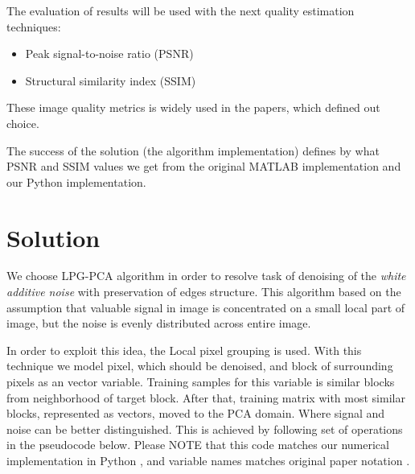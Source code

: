 The evaluation of results will be used with the next quality estimation techniques: 
\begin{itemize}
    \item Peak signal-to-noise ratio (PSNR) 
    \item Structural similarity index (SSIM) 
\end{itemize}
These image quality metrics is widely used in the papers, which defined out choice. 

The success of the solution (the algorithm implementation) defines by what PSNR and SSIM values we get from the original MATLAB implementation and our Python implementation. 

\section{Solution}

We choose LPG-PCA algorithm in order to resolve task of denoising of the \emph{white additive noise} with preservation of edges structure. This algorithm based on the assumption that valuable signal in image is concentrated on a small local part of image, but the noise is evenly distributed across entire image. 

In order to exploit this idea, the Local pixel grouping is used. With this technique we model pixel, which should be denoised, and block of surrounding pixels as an vector variable. Training samples for this variable is similar blocks from neighborhood of target block. After that, training matrix with most similar blocks, represented as vectors, moved to the PCA domain. Where signal and noise can be better distinguished. This is achieved by following set of operations in the pseudocode below. Please NOTE that this code matches our numerical implementation in Python \cite{our_github}, and variable names matches original paper notation \cite{zhang2010two}.

